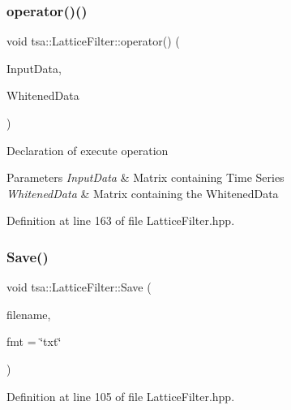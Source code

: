 \subsubsection{\texorpdfstring{operator()()}{operator()()}}
{\footnotesize\ttfamily void tsa\+::\+Lattice\+Filter\+::operator() (\begin{DoxyParamCaption}\item[{\hyperlink{namespacetsa_ac599574bcc094eda25613724b8f3ca9e}{Seq\+View\+Double} \&}]{Input\+Data,  }\item[{\hyperlink{namespacetsa_ac599574bcc094eda25613724b8f3ca9e}{Seq\+View\+Double} \&}]{Whitened\+Data }\end{DoxyParamCaption})\hspace{0.3cm}{\ttfamily [inline]}}

Declaration of execute operation


\begin{DoxyParams}{Parameters}
{\em Input\+Data} & Matrix containing Time Series \\
\hline
{\em Whitened\+Data} & Matrix containing the Whitened\+Data \\
\hline
\end{DoxyParams}


Definition at line 163 of file Lattice\+Filter.\+hpp.

\mbox{\label{classtsa_1_1_lattice_filter_ac599ab3a2134d53e0685f91a0a673ed4}} 
\subsubsection{\texorpdfstring{Save()}{Save()}}
{\footnotesize\ttfamily void tsa\+::\+Lattice\+Filter\+::\+Save (\begin{DoxyParamCaption}\item[{const char $\ast$}]{filename,  }\item[{const char $\ast$}]{fmt = {\ttfamily \char`\"{}txt\char`\"{}} }\end{DoxyParamCaption})\hspace{0.3cm}{\ttfamily [inline]}}



Definition at line 105 of file Lattice\+Filter.\+hpp.

\mbox{\label{classtsa_1_1_lattice_filter_ae9bd581cbcd1183a0dd7c557fe687422}} 
